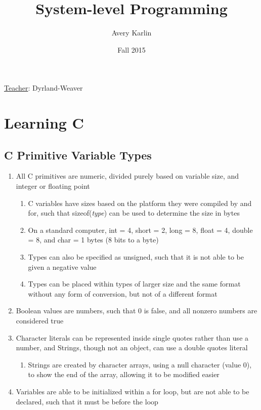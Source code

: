 \documentclass[11 pt, twoside]{article}
\begin{document}
\title{System-level Programming}
\author{Avery Karlin}
\date{Fall 2015}

\maketitle
\newpage
\tableofcontents
\vspace{11pt}
\noindent
\underline{Teacher}: Dyrland-Weaver
\newpage

\section{Learning C}
\subsection{C Primitive Variable Types}
\begin{enumerate}
\item All C primitives are numeric, divided purely based on variable size, and integer or floating point
\begin{enumerate}
\item C variables have sizes based on the platform they were compiled by and for, such that sizeof(\textit{type}) can be used to determine the size in bytes
\item On a standard computer, int = 4, short = 2, long = 8, float = 4, double = 8, and char = 1 bytes (8 bits to a byte)
\item Types can also be specified as unsigned, such that it is not able to be given a negative value
\item Types can be placed within types of larger size and the same format without any form of conversion, but not of a different format
\end{enumerate}
\item Boolean values are numbers, such that 0 is false, and all nonzero numbers are considered true
\item Character literals can be represented inside single quotes rather than use a number, and Strings, though not an object, can use a double quotes literal
\begin{enumerate}
\item Strings are created by character arrays, using a null character (value 0), to show the end of the array, allowing it to be modified easier
\end{enumerate}
\item Variables are able to be initialized within a for loop, but are not able to be declared, such that it must be before the loop
\end{enumerate}
\end{document}
